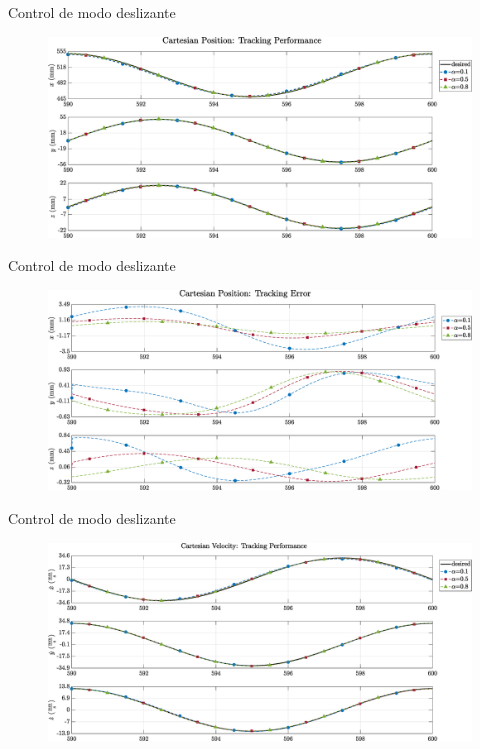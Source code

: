 \documentclass[10pt]{beamer} %
\begin{document}
	\begin{frame}[fragile]{Control de modo deslizante}
		\begin{figure}
			\centering
			\hspace*{-0.5cm}\includegraphics[width=1.1\textwidth]{img/SMCi/circular_traj/600_seg/articular_SMCi_pos_xyz_compare.eps}
		\end{figure}
	\end{frame}
	
	\begin{frame}[fragile]{Control de modo deslizante}
		\begin{figure}
			\centering
			\hspace*{-0.5cm}\includegraphics[width=1.1\textwidth]{img/SMCi/circular_traj/600_seg/articular_SMCi_pos_xyz_error_compare.eps}
		\end{figure}
	\end{frame}
	
	\begin{frame}[fragile]{Control de modo deslizante}
		\begin{figure}
			\centering
			\hspace*{-0.5cm}\includegraphics[width=1.1\textwidth]{img/SMCi/circular_traj/600_seg/articular_SMCi_vel_xyz_compare.eps}
		\end{figure}
	\end{frame}
	
\end{document}
